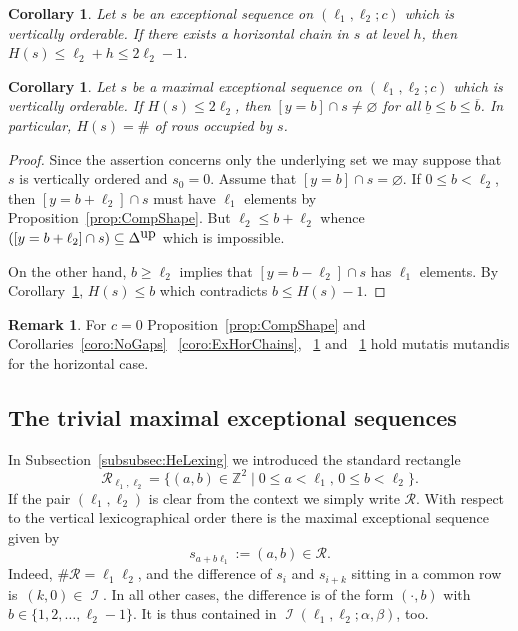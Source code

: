 \documentclass[11pt]{article}
\newtheorem{coro}[theo]{Corollary}
\theoremstyle{definition}
\newtheorem{rema}[theo]{Remark}
\numberwithin{equation}{section}
\newcommand{\Z}{\mathbb Z}
\newcommand{\CI}{{\mathcal I}}
\newcommand{\CR}{{\mathcal R}}
\newcommand{\nImm}{\operatorname{\CI}}
\newcommand{\xa}{\alpha}
\newcommand{\xb}{\beta}
\newcommand{\cl}{s}
\newcommand{\DeltaUp}{\Delta^{\mbox{\tiny up}}}
\newcommand{\Rect}{\CR}
\newcommand{\mes}{maximal exceptional sequence}
\renewcommand{\sharp}{\#}
\newcommand{\ssect}[1]{Subsection~\ref{#1}}
\begin{document}
\begin{coro}
\label{coro:SlimTwisted}
Let $\cl$ be an exceptional sequence 
on $(\ell_1,\ell_2;c)$ which is
vertically orderable. 
If there exists a horizontal chain in $\cl$ 
at level $h$, then $H(\cl)\leq\ell_2+h\leq
2\ell_2-1$.
\end{coro}

\begin{coro}
\label{coro:VertOcc}
{Let $\cl$ be a {\mes} 
on $(\ell_1,\ell_2;c)$ which is
vertically orderable. If 
$H(\cl)\leq2\ell_2$, 
then $[y=b]\cap\cl\not=\varnothing$ 
for all $\underline b\leq b\leq\overline b$.
In particular, $H(\cl)=\sharp$ of 
rows occupied by $\cl$.}
\end{coro}

\begin{proof}
{Since the assertion concerns only the
underlying set we may suppose that 
$\cl$ is vertically ordered and $\cl_0=0$.
Assume that
$[y=b]\cap\cl=\varnothing$. If $0\leq b<\ell_2$, 
then $[y=b+\ell_2]\cap\cl$ must have $\ell_1$ 
elements by Proposition~\ref{prop:CompShape}. 
But $\ell_2\leq b+\ell_2$ whence 
$([y=b+\ell_2]\cap\cl)\subseteq\DeltaUp$ which is 
impossible.}

{On the other hand, 
$b\geq\ell_2$ implies that 
$[y=b-\ell_2]\cap\cl$ has $\ell_1$ 
elements. By Corollary~\ref{coro:SlimTwisted},
$H(\cl)\leq b$ which contradicts $b\leq H(\cl)-1$.}
\end{proof}

\begin{rema}
For $c=0$ Proposition~\ref{prop:CompShape} and 
Corollaries~\ref{coro:NoGaps}
~\ref{coro:ExHorChains},
~\ref{coro:SlimTwisted} and
~\ref{coro:VertOcc} hold mutatis 
mutandis for the {horizontal} case. 
\end{rema}

\subsection{The trivial {\mes}s}
\label{subsec:TrivMes}
In \ssect{subsubsec:HeLexing}
we introduced the standard rectangle
$$
\Rect_{\ell_1,\ell_2}=\{(a,b)\in\Z^2
\mid0\leq a<\ell_1,\,0\leq b<\ell_2\}.
$$
{If the pair $(\ell_1,\ell_2)$ is clear from 
the context we simply write $\Rect$. With respect to 
the vertical lexicographical order there is the maximal exceptional 
sequence given by}
$$
\cl_{a+b\ell_1}:=(a,b)\in\Rect.
$$
Indeed, $\sharp\Rect=\ell_1\ell_2$, 
and the difference of $\cl_i$ and 
$\cl_{i+k}$ sitting in a common row is~$(k,0)\in\nImm$. In all other cases, the 
difference is of the form $(\cdot,b)$ with 
\mbox{$b\in\{1,2,\ldots,\ell_2-1\}$}. It is thus 
contained in $\nImm(\ell_1,\ell_2;\xa,\xb)$, too.
\end{document}
